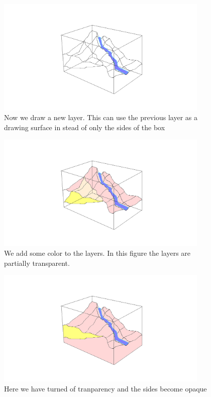 \documentclass[12pt,a4paper]{article}
\begin{document}
\begin{itemize}
\begin{figure}
\centering
\includegraphics[width=4in]{drawNewLayer}
\caption[]{
  \footnotesize
  Now we draw a new layer. This can use the previous layer as a drawing surface in stead of only the sides of the box
  \label{fig:drawNewLayer}
}
\end{figure}

\begin{figure}
\centering
\includegraphics[width=4in]{addColor}
\caption[]{
  \footnotesize
  We add some color to the layers. In this figure the layers are partially transparent.
  \label{fig:addColor}
}
\end{figure}

\begin{figure}
\centering
\includegraphics[width=4in]{offTransparency}
\caption[]{
  \footnotesize
  Here we have turned of tranparency and the sides become opaque
  \label{fig:offTransparency}
}
\end{figure}


\end{itemize}
\end{document}
